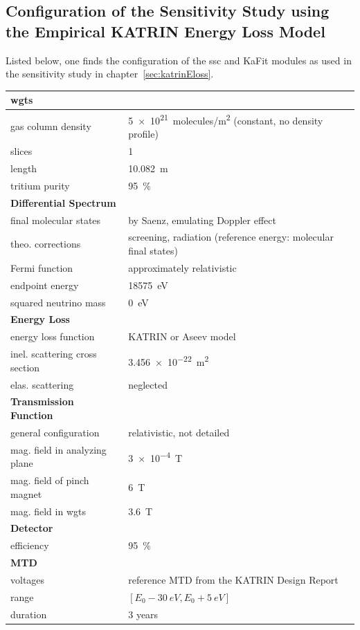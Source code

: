 \begin{samepage}
\section{Configuration of the Sensitivity Study using the Empirical KATRIN Energy Loss Model}
\label{sec:appendixKatrinElossSSCConfig}
Listed below, one finds the configuration of the \gls{ssc} and KaFit modules as used in the sensitivity study in chapter~\ref{sec:katrinEloss}.

\newcommand{\myModelConfigTableStrut}{\rule{0pt}{4ex}}
\begin{tabular}{ll}
	\toprule
	\textbf{\gls{wgts}} & \\
	\midrule
	gas column density & \SI{5e21}{molecules/m^2} (constant, no density profile) \\
	slices & 1 \\
	length & \SI{10.082}{m} \\
	tritium purity & \SI{95}{\percent} \\
	\myModelConfigTableStrut
	\textbf{Differential Spectrum} & \\
	\midrule
	final molecular states & by Saenz, emulating Doppler effect \\
	theo. corrections & screening, radiation (reference energy: molecular final states) \\
	Fermi function & approximately relativistic \\
	endpoint energy & \SI{18575}{eV} \\
	squared neutrino mass & \SI{0}{eV} \\
	\myModelConfigTableStrut
	\textbf{Energy Loss} & \\
	\midrule
	energy loss function & KATRIN or Aseev model \\
	inel. scattering cross section & \SI{3.456e-22}{m^2} \\
	elas. scattering & neglected \\
	\myModelConfigTableStrut
	\textbf{Transmission Function} & \\
	\midrule
	general configuration & relativistic, not detailed \\
	mag. field in analyzing plane & \SI{3e-4}{T} \\
	mag. field of pinch magnet & \SI{6}{T} \\
	mag. field in \gls{wgts} & \SI{3.6}{T} \\
	\myModelConfigTableStrut
	\textbf{Detector} & \\
	\midrule
	efficiency & \SI{95}{\percent} \\
	\myModelConfigTableStrut
	\textbf{MTD} & \\
	\midrule
	voltages & reference MTD from the KATRIN Design Report \\
	range & $[E_0-\SI{30}{eV},E_0+\SI{5}{eV}]$ \\
	duration & 3 years \\
	\bottomrule
\end{tabular}
\end{samepage}